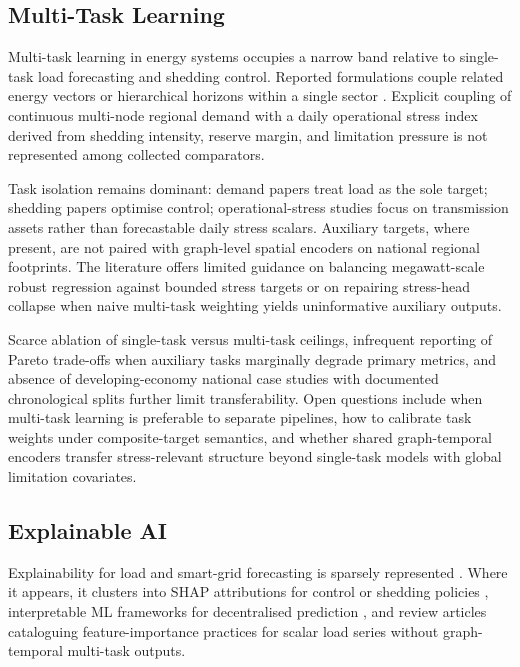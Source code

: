\subsection{Multi-Task Learning}\label{subsection:multi_task_learning}

Multi-task learning in energy systems \cite{Caruana1997Multitask} occupies a narrow band relative to single-task load forecasting and shedding control. Reported formulations couple related energy vectors or hierarchical horizons within a single sector \cite{Song2024MultiTaskEnergy,Zhuang2024MultiScaleGNN}. Explicit coupling of continuous multi-node regional demand with a daily operational stress index derived from shedding intensity, reserve margin, and limitation pressure is not represented among collected comparators.

Task isolation remains dominant: demand papers treat load as the sole target; shedding papers optimise control; operational-stress studies focus on transmission assets rather than forecastable daily stress scalars. Auxiliary targets, where present, are not paired with graph-level spatial encoders on national regional footprints. The literature offers limited guidance on balancing megawatt-scale robust regression against bounded stress targets or on repairing stress-head collapse when naive multi-task weighting yields uninformative auxiliary outputs.

Scarce ablation of single-task versus multi-task ceilings, infrequent reporting of Pareto trade-offs when auxiliary tasks marginally degrade primary metrics, and absence of developing-economy national case studies with documented chronological splits further limit transferability. Open questions include when multi-task learning is preferable to separate pipelines, how to calibrate task weights under composite-target semantics, and whether shared graph-temporal encoders transfer stress-relevant structure beyond single-task models with global limitation covariates.

\subsection{Explainable AI}\label{subsection:explainable_ai}

Explainability for load and smart-grid forecasting is sparsely represented \cite{Baur2024XAIReview}. Where it appears, it clusters into SHAP attributions for control or shedding policies \cite{Wang2026SHAPLoadShedding,Lundberg2017SHAP}, interpretable ML frameworks for decentralised prediction \cite{Cifci2025InterpretableSmartGrid}, and review articles cataloguing feature-importance practices for scalar load series without graph-temporal multi-task outputs.

